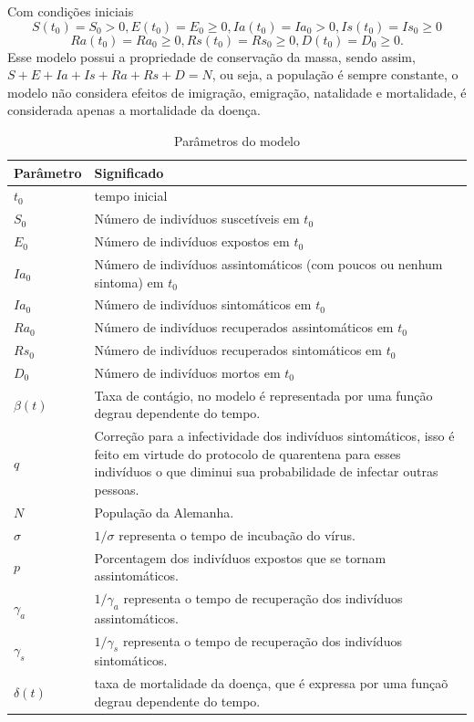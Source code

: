\documentclass[12pt]{article}
\begin{document}
\noindent Com condições iniciais $$S(t_0) = S_0 > 0, E(t_0) = E_0 \geq 0, Ia(t_0) = Ia_0 >0, Is(t_0) = Is_0 \geq 0$$
$$Ra(t_0) = Ra_0 \geq 0, Rs(t_0) = Rs_0 \geq 0, D(t_0) = D_0 \geq 0.$$ Esse modelo possui a propriedade de conservação da massa, sendo assim, $S + E + Ia + Is + Ra + Rs + D = N$, ou seja, a população é sempre constante, o modelo não considera efeitos de imigração, emigração, natalidade e mortalidade, é considerada apenas a mortalidade da doença.

\begin{table}[h]
\centering
\begin{small}
\caption{Parâmetros do modelo} \label{Tabela1}
\begin{tabular}{|p{2cm}|p{14cm}|}
\hline
            Parâmetro & Significado \\
\hline
$t_0$ & tempo inicial \\
\hline
$S_0$ & Número de indivíduos suscetíveis em $t_0$\\
\hline 
$E_0$ & Número de indivíduos expostos em $t_0$\\
\hline 
$Ia_0$ & Número de indivíduos assintomáticos (com poucos ou nenhum sintoma) em $t_0$\\
\hline 
$Ia_0$ & Número de indivíduos sintomáticos em $t_0$\\
\hline 
$Ra_0$ & Número de indivíduos recuperados assintomáticos em $t_0$\\
\hline 
$Rs_0$ & Número de indivíduos recuperados sintomáticos em $t_0$\\
\hline 
$D_0$ & Número de indivíduos mortos em $t_0$\\
\hline 
$\beta(t)$ & Taxa de contágio, no modelo é representada por uma função degrau dependente do tempo. \\
\hline
$q$ & Correção para a infectividade dos indivíduos sintomáticos, isso é feito em virtude do protocolo de quarentena para esses indivíduos o que diminui sua probabilidade de infectar outras pessoas.\\
\hline
$N$ & População da Alemanha. \\
\hline
$\sigma$ & $1/ \sigma$ representa o tempo de incubação do vírus. \\
\hline
$p$ & Porcentagem dos indivíduos expostos que se tornam assintomáticos.\\
\hline
$\gamma_a$ & $1 / \gamma_a$ representa o tempo de recuperação dos indivíduos assintomáticos. \\
\hline
$\gamma_s$ & $1 / \gamma_s$ representa o tempo de recuperação dos indivíduos sintomáticos.\\
\hline
$\delta(t)$ & taxa de mortalidade da doença, que é expressa por uma funçaõ degrau dependente do tempo. \\
\hline
\end{tabular}
\end{small}
\end{table}
\end{document}
